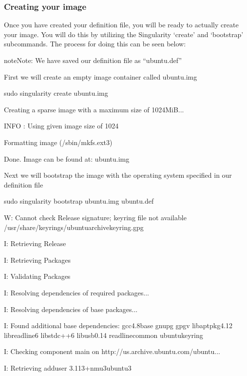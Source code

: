 \documentclass[letterpaper,10pt,english]{sphinxmanual}
\begin{document}
\subsubsection{Creating your image}
\label{\detokenize{appendix:id2}}
Once you have created your definition file, you will be ready to actually create your image. You will do this by utilizing the Singularity ‘create’ and ‘bootstrap’ subcommands. The process for doing this
can be seen below:

\begin{sphinxadmonition}{note}{Note:}
We have saved our definition file as “ubuntu.def”
\end{sphinxadmonition}

%
\begin{sphinxVerbatim}[commandchars=\\\{\}]
\PYGZsh{} First we will create an empty image container called ubuntu.img

\PYGZdl{} sudo singularity create ubuntu.img

Creating a sparse image with a maximum size of 1024MiB...

INFO   : Using given image size of 1024

Formatting image (/sbin/mkfs.ext3)

Done. Image can be found at: ubuntu.img


\PYGZsh{} Next we will bootstrap the image with the operating system specified in our definition file

\PYGZdl{} sudo singularity bootstrap ubuntu.img ubuntu.def

W: Cannot check Release signature; keyring file not available /usr/share/keyrings/ubuntu\PYGZhy{}archive\PYGZhy{}keyring.gpg

I: Retrieving Release

I: Retrieving Packages

I: Validating Packages

I: Resolving dependencies of required packages...

I: Resolving dependencies of base packages...

I: Found additional base dependencies: gcc\PYGZhy{}4.8\PYGZhy{}base gnupg gpgv libapt\PYGZhy{}pkg4.12 libreadline6 libstdc++6 libusb\PYGZhy{}0.1\PYGZhy{}4 readline\PYGZhy{}common ubuntu\PYGZhy{}keyring

I: Checking component main on http://us.archive.ubuntu.com/ubuntu...

I: Retrieving adduser 3.113+nmu3ubuntu3


\end{sphinxVerbatim}
\end{document}
